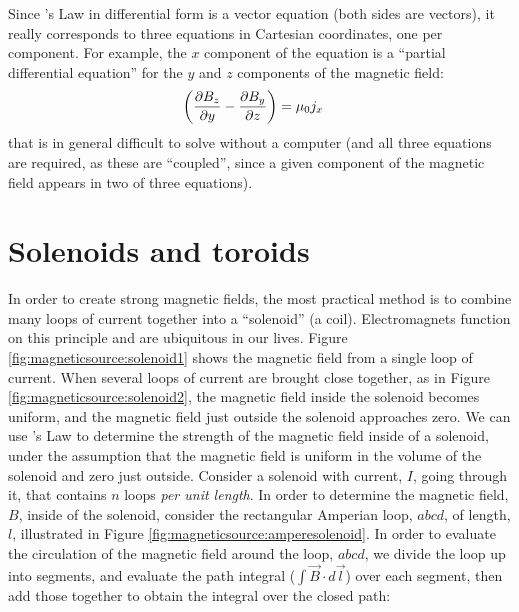 Since \ampere's Law in differential form is a vector equation (both sides are vectors), it really corresponds to three equations in Cartesian coordinates, one per component. For example, the $x$ component of the equation is a ``partial differential equation'' for the $y$ and $z$ components of the magnetic field:
\begin{align*}
\left(\frac{\partial B_z}{\partial y}-\frac{\partial B_y}{\partial z}\right) &=\mu_0j_x
\end{align*}
that is in general difficult to solve without a computer (and all three equations are required, as these are ``coupled'', since a given component of the magnetic field appears in two of three equations).
\section{Solenoids and toroids}
In order to create strong magnetic fields, the most practical method is to combine many loops of current together into a ``solenoid'' (a coil). Electromagnets function on this principle and are ubiquitous in our lives. Figure \ref{fig:magneticsource:solenoid1} shows the magnetic field from a single loop of current.  
When several loops of current are brought close together, as in Figure \ref{fig:magneticsource:solenoid2}, the magnetic field inside the solenoid becomes uniform, and the magnetic field just outside the solenoid approaches zero. 
We can use \ampere's Law to determine the strength of the magnetic field inside of a solenoid, under the assumption that the magnetic field is uniform in the volume of the solenoid and zero just outside. Consider a solenoid with current, $I$, going through it, that contains $n$ loops \textit{per unit length}. In order to determine the magnetic field, $B$, inside of the solenoid, consider the rectangular Amperian loop, $abcd$, of length, $l$, illustrated in Figure \ref{fig:magneticsource:amperesolenoid}.
In order to evaluate the circulation of the magnetic field around the loop, $abcd$, we divide the loop up into segments, and evaluate the path integral ($\int \vec B \cdot d\vec l$) over each segment, then add those together to obtain the integral over the closed path:
